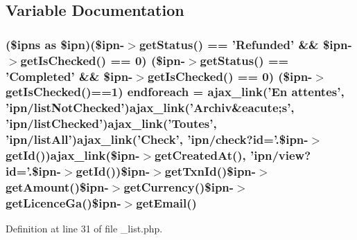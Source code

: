 \subsection{Variable Documentation}
\hypertarget{backend_2modules_2ipn_2templates_2__list_8php_a72953b94e473f2acdb8e60afffbea923}{
\subsubsection[{endforeach}]{(\$ipns as \$ipn)(\$ipn-\/$>$get\-Status() == 'Refunded' \&\& \$ipn-\/$>$get\-Is\-Checked() == 0) (\$ipn-\/$>$get\-Status() == 'Completed' \&\& \$ipn-\/$>$get\-Is\-Checked() == 0) (\$ipn-\/$>$get\-Is\-Checked()==1) endforeach = ajax\-\_\-link('En attentes', 'ipn/list\-Not\-Checked')ajax\-\_\-link('Archiv\&{\bf eacute};s', 'ipn/list\-Checked')ajax\-\_\-link('Toutes', 'ipn/list\-All')ajax\-\_\-link('Check', 'ipn/check?{\bf id}='.\$ipn-\/$>$get\-Id())ajax\-\_\-link(\$ipn-\/$>${\bf get\-Created\-At}(), 'ipn/view?{\bf id}='.\$ipn-\/$>$get\-Id())\$ipn-\/$>$get\-Txn\-Id()\$ipn-\/$>$get\-Amount()\$ipn-\/$>$get\-Currency()\$ipn-\/$>$get\-Licence\-Ga()\$ipn-\/$>$get\-Email()}}\label{backend_2modules_2ipn_2templates_2__list_8php_a72953b94e473f2acdb8e60afffbea923}


Definition at line 31 of file \-\_\-list.\-php.

